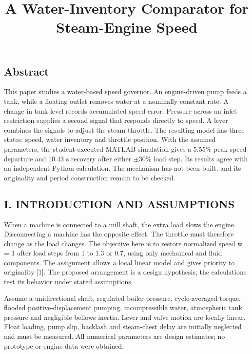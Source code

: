\documentclass[conference]{IEEEtran}
\begin{document}
\title{A Water-Inventory Comparator for Steam-Engine Speed}
\author{}
\maketitle
\subsection*{Abstract}
This paper studies a water-based speed governor. An engine-driven pump feeds a tank, while a floating outlet removes water at a nominally constant rate. A change in tank level records accumulated speed error. Pressure across an inlet restriction supplies a second signal that responds directly to speed. A lever combines the signals to adjust the steam throttle. The resulting model has three states: speed, water inventory and throttle position. With the assumed parameters, the student-executed MATLAB simulation gives a 5.55\% peak speed departure and 10.43 s recovery after either \ensuremath{\pm}30\% load step. Its results agree with an independent Python calculation. The mechanism has not been built, and its originality and period construction remain to be checked.

\subsection*{I. INTRODUCTION AND ASSUMPTIONS}
When a machine is connected to a mill shaft, the extra load slows the engine. Disconnecting a machine has the opposite effect. The throttle must therefore change as the load changes. The objective here is to restore normalized speed w = 1 after load steps from 1 to 1.3 or 0.7, using only mechanical and fluid components. The assignment allows a local linear model and gives priority to originality [1]. The proposed arrangement is a design hypothesis; the calculations test its behavior under stated assumptions.

Assume a unidirectional shaft, regulated boiler pressure, cycle-averaged torque, flooded positive-displacement pumping, incompressible water, atmospheric tank pressure and negligible bellows inertia. Lever and valve motion are locally linear. Float loading, pump slip, backlash and steam-chest delay are initially neglected and must be measured. All numerical parameters are design estimates; no prototype or engine data were obtained.
\end{document}
